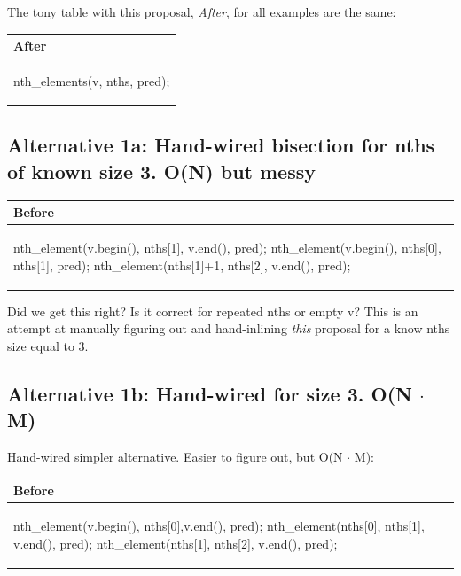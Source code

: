 The tony table with this proposal, \emph{After}, for all examples are the same:\newline

\begin{tabular}{|l|} 
  \hline 
  \textbf{After} \\
  \hline 
\begin{codeblock} 
nth_elements(v, nths, pred);
\end{codeblock} 
\\
\hline 
\end{tabular} 


\subsection*{Alternative 1a: Hand-wired bisection for nths of known size 3. O(N) but messy}

\begin{tabular}{|l|} 
  \hline 
  \textbf{Before} \\
  \hline 
\begin{codeblock} 
nth_element(v.begin(), nths[1], v.end(), pred);
nth_element(v.begin(), nths[0], nths[1], pred);
nth_element(nths[1]+1, nths[2], v.end(), pred);
\end{codeblock} 
\\
\hline 
\end{tabular} 

Did we get this right? Is it correct for repeated nths or empty v?
This is an attempt at manually figuring out and hand-inlining \emph{this} proposal for a know nths size equal to 3.

\subsection*{Alternative 1b: Hand-wired for size 3. O(N $\cdot$ M)}

Hand-wired simpler alternative. Easier to figure out, but O(N $\cdot$ M):

\begin{tabular}{|l|} 
  \hline 
  \textbf{Before} \\
  \hline 
\begin{codeblock} 
nth_element(v.begin(), nths[0],v.end(), pred);
nth_element(nths[0], nths[1], v.end(), pred);
nth_element(nths[1], nths[2], v.end(), pred);
\end{codeblock} 
\\
\hline 
\end{tabular} 


